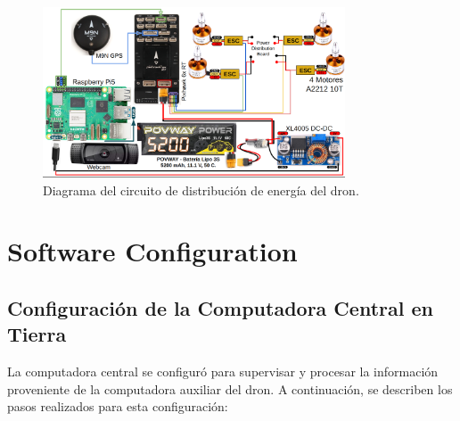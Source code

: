     \begin{center}
        \begin{figure}[h!]
            \centering
            \includegraphics[width=0.8\textwidth]{pictures/drone_electronic_diagram.png}
            \caption{Diagrama del circuito de distribución de energía del dron.}
        \end{figure}
    \end{center}
        

\section{Software Configuration}

\subsection{Configuración de la Computadora Central en Tierra} 
La computadora central se configuró para supervisar y procesar la información proveniente de la computadora auxiliar del dron. A continuación, se describen los pasos realizados para esta configuración:

